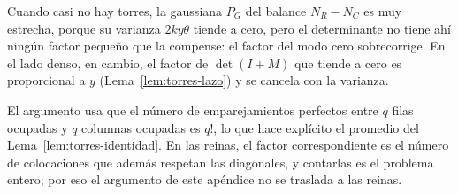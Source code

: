 \begin{observacion}[Lectura]
Cuando casi no hay torres, la gaussiana $P_G$ del balance $N_R-N_C$ es muy estrecha, porque su varianza
$2ky\theta$ tiende a cero, pero el determinante no tiene ahí ningún factor pequeño que la compense: el
factor del modo cero sobrecorrige. En el lado denso, en cambio, el factor de $\det(I+M)$ que tiende a cero
es proporcional a $y$ (Lema~\ref{lem:torres-lazo}) y se cancela con la varianza.

El argumento usa que el número de emparejamientos perfectos entre $q$ filas ocupadas y $q$ columnas
ocupadas es $q!$, lo que hace explícito el promedio del Lema~\ref{lem:torres-identidad}. En las reinas, el
factor correspondiente es el número de colocaciones que además respetan las diagonales, y contarlas es el
problema entero; por eso el argumento de este apéndice no se traslada a las reinas.
\end{observacion}
